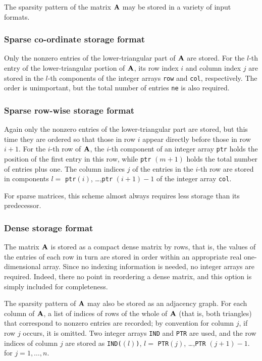 \documentclass{galahad}
\begin{document}

\galmatrix
The sparsity pattern of the matrix ${\mathbf{A}}$ may be stored in 
a variety of input formats.

\subsubsection{Sparse co-ordinate storage format}\label{coordinate}
Only the nonzero entries of the lower-triangular part of ${\mathbf{A}}$ are stored.
For the $l$-th entry of the lower-triangular portion of ${\mathbf{A}}$,
its row index $i$ and column index $j$
are stored in the $l$-th components of the integer arrays 
{\tt row} and {\tt col}, respectively.
The order is unimportant, but the total number of entries
{\tt ne} is also required.

\subsubsection{Sparse row-wise storage format}\label{rowwise}
Again only the nonzero entries of the lower-triangular part are stored,
but this time they are ordered so that those in row $i$ appear directly
before those in row $i+1$. For the $i$-th row of ${\mathbf{A}}$, the $i$-th component
of an integer array {\tt ptr} holds the position of the first entry in this row,
while {\tt ptr} $(m+1)$ holds the total number of entries plus one.
The column indices $j$ of the entries in the $i$-th row are 
stored in components $l =$ {\tt ptr}$(i)$, \ldots ,{\tt ptr} $(i+1)-1$ 
of the integer array {\tt col}.

For sparse matrices, this scheme almost always requires less storage than
its predecessor.

\subsubsection{Dense storage format}\label{dense}
The matrix ${\mathbf{A}}$ is stored as a compact
dense matrix by rows, that is, the values of the entries of each row in turn are
stored in order within an appropriate real one-dimensional array.
Since no indexing information is needed, no integer arrays are required.
Indeed, there no point in reordering a dense matrix, and this option
is simply included for completeness.


\galgraph
The sparsity pattern of ${\mathbf{A}}$ may also be stored as an adjacency graph.
For each column of ${\mathbf{A}}$, a list of indices of rows of the whole of 
${\mathbf{A}}$ (that is, both triangles) that correspond to nonzero entries are 
recorded; by convention for column $j$, if row $j$ occurs, it is omitted. 
Two integer arrays {\tt IND} and {\tt PTR}
are used, and the row indices of column $j$ are stored as
{\tt IND(}$(l)${\tt )}, $l =$ {\tt PTR}$(j)$, \ldots ,{\tt PTR} $(j+1)-1$.
for $j = 1,\ldots,n$.
\end{document}
